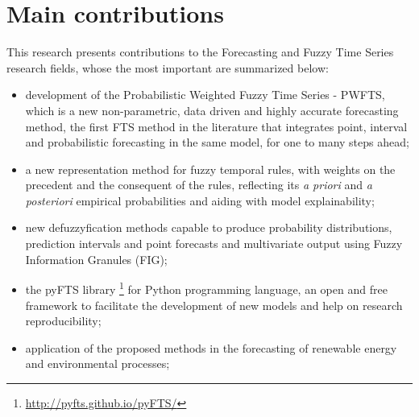 \section{Main contributions} 

This research presents contributions to the Forecasting and Fuzzy Time Series research fields, whose the most important are summarized below:

\begin{itemize}
    \item development of the Probabilistic Weighted Fuzzy Time Series - PWFTS, which is a new non-parametric, data driven and highly accurate forecasting method, the first FTS method in the literature that integrates point, interval and probabilistic forecasting in the same model, for one to many steps ahead;
    \item a new representation method for fuzzy temporal rules, with weights on the precedent and the consequent of the rules, reflecting its \textit{a priori} and \textit{a posteriori} empirical probabilities and aiding with model explainability;
    \item new defuzzyfication methods capable to produce probability distributions, prediction intervals and point forecasts and multivariate output using Fuzzy Information Granules (FIG);
    \item the pyFTS library \cite{pyFTS}\footnote{\url{http://pyfts.github.io/pyFTS/}} for Python programming language, an open and free framework to facilitate the development of new models and help on research reproducibility;  
    \item application of the proposed methods in the forecasting of renewable energy and environmental processes;
\end{itemize}


